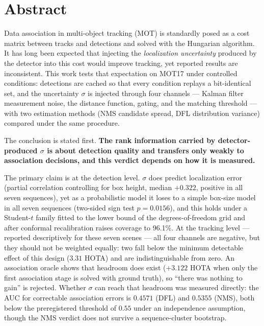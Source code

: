 \documentclass[12pt,a4paper,oneside]{report}
\begin{document}
\chapter*{Abstract}

Data association in multi-object tracking (MOT) is standardly posed as a cost matrix between tracks and detections and solved with the Hungarian algorithm. It has long been expected that injecting the \textit{localization uncertainty} produced by the detector into this cost would improve tracking, yet reported results are inconsistent. This work tests that expectation on MOT17 under controlled conditions: detections are cached so that every condition replays a bit-identical set, and the uncertainty $\sigma$ is injected through four channels --- Kalman filter measurement noise, the distance function, gating, and the matching threshold --- with two estimation methods (NMS candidate spread, DFL distribution variance) compared under the same procedure.

The conclusion is stated first. \textbf{The rank information carried by detector-produced $\sigma$ is about detection quality and transfers only weakly to association decisions, and this verdict depends on how it is measured.}

The primary claim is at the detection level. $\sigma$ does predict localization error (partial correlation controlling for box height, median $+0.322$, positive in all seven sequences), yet as a probabilistic model it loses to a simple box-size model in all seven sequences (two-sided sign test $p = 0.0156$), and this holds under a Student-$t$ family fitted to the lower bound of the degrees-of-freedom grid and after conformal recalibration raises coverage to 96.1\%. At the tracking level --- reported descriptively for these seven scenes --- all four channels are negative, but they should not be weighted equally: two fall below the minimum detectable effect of this design ($3.31$ HOTA) and are indistinguishable from zero. An association oracle shows that headroom does exist ($+3.122$ HOTA when only the first association stage is solved with ground truth), so ``there was nothing to gain'' is rejected. Whether $\sigma$ can reach that headroom was measured directly: the AUC for correctable association errors is $0.4571$ (DFL) and $0.5355$ (NMS), both below the preregistered threshold of $0.55$ under an independence assumption, though the NMS verdict does not survive a sequence-cluster bootstrap.
\end{document}
